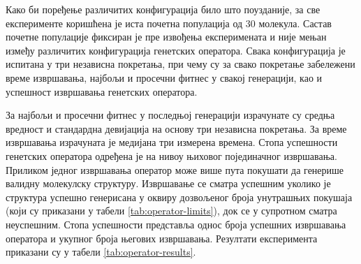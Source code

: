 \documentclass[12pt,oneside]{memoir}
\begin{document}
Како би поређење различитих конфигурација било што поузданије,
за све експерименте коришћена је иста почетна популација од 30
молекула. Састав почетне популације фиксиран је пре извођења
експеримената и није мењан између различитих конфигурација
генетских оператора. Свака конфигурација је испитана у три
независна покретања, при чему су за свако покретање забележени
време извршавања, најбољи и просечни фитнес у свакој генерацији,
као и успешност извршавања генетских оператора.

За најбољи и просечни фитнес у последњој генерацији израчунате су
средња вредност и стандардна девијација на основу три независна
покретања. За време извршавања израчуната је медијана три
измерена времена. Стопа успешности генетских оператора одређена 
је на нивоу њиховог појединачног извршавања. Приликом једног 
извршавања оператор може више пута покушати да генерише 
валидну молекулску структуру. Извршавање се сматра успешним 
уколико је структура успешно генерисана у оквиру дозвољеног 
броја унутрашњих покушаја (који су приказани у табели \ref{tab:operator-limits}), док се у супротном сматра неуспешним. Стопа 
успешности представља однос броја успешних извршавања 
оператора и укупног броја његових извршавања. Резултати 
експеримента приказани су у табели
\ref{tab:operator-results}.
\end{document}
